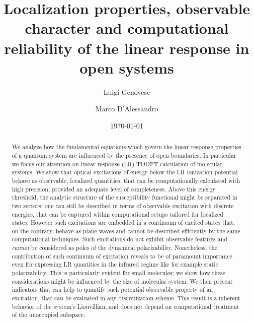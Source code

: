 \documentclass[reprint,aps,prb]{revtex4-1}
\begin{document}

\title{Localization properties, observable character and computational reliability of the linear response in open systems}

\author{Luigi Genovese}
\author{Marco D'Alessandro}%

\date{\today}

\begin{abstract}
We analyze how the fundamental equations which govern the linear response properties of a quantum system are influenced by the presence of open boundaries.
In particular we focus our attention on linear-response (LR)-TDDFT calculation of molecular systems. We show that optical excitations of energy below the LR ionization potential 
behave as observable, localized quantities, that can be computationally calculated with high precision, provided an adequate level of completeness.
Above this energy threshold, the analytic structure of the susceptibility functional might be separated in two sectors: one can still be described in terms of observable excitation 
with discrete energies, that can be captured within computational setups tailored for localized states. However such excitations are embedded in a continuum of excited states 
that, on the contrary, behave as plane waves and cannot be described efficiently by the same computational techniques. Such excitations do not exhibit observable features and 
\emph{cannot} be considered as poles of the dynamical polarizability. Nonetheless, the contribution of such continuum of excitation reveals to be of paramount importance even 
for expressing LR quantities in the infrared regime like for example static polarizability.
This is particularly evident for small molecules; we show how these considerations might be influenced by the size of molecular system.
We then present indicators that can help to quantify such potential observable property of an excitation, that can be evaluated 
in any discretization scheme.  This result is a inherent behavior of the system's Liouvillian, and does not depend on computational treatment of the 
unoccupied subspace.
\end{abstract}

\maketitle
\end{document}
